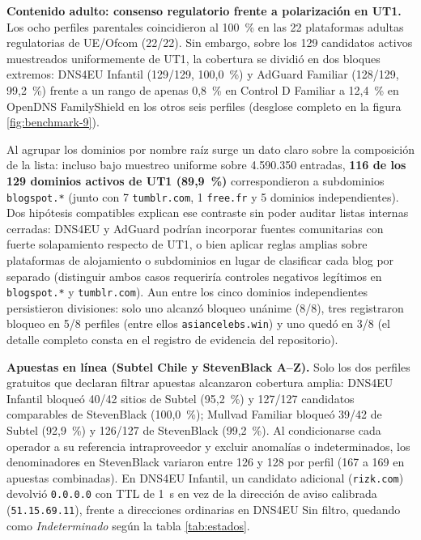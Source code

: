 \documentclass[10pt,a4paper]{article}
\begin{document}
\textbf{Contenido adulto: consenso regulatorio frente a polarización en UT1.} Los ocho perfiles parentales coincidieron al 100~\% en las 22 plataformas adultas regulatorias de UE/Ofcom (22/22). Sin embargo, sobre los 129 candidatos activos muestreados uniformemente de UT1, la cobertura se dividió en dos bloques extremos: DNS4EU Infantil (129/129, 100,0~\%) y AdGuard Familiar (128/129, 99,2~\%) frente a un rango de apenas 0,8~\% en Control D Familiar a 12,4~\% en OpenDNS FamilyShield en los otros seis perfiles (desglose completo en la figura \ref{fig:benchmark-9}).

Al agrupar los dominios por nombre raíz surge un dato claro sobre la composición de la lista: incluso bajo muestreo uniforme sobre 4.590.350 entradas, \textbf{116 de los 129 dominios activos de UT1 (89,9~\%)} correspondieron a subdominios \texttt{blogspot.*} (junto con 7 \texttt{tumblr.com}, 1 \texttt{free.fr} y 5 dominios independientes). Dos hipótesis compatibles explican ese contraste sin poder auditar listas internas cerradas: DNS4EU y AdGuard podrían incorporar fuentes comunitarias con fuerte solapamiento respecto de UT1, o bien aplicar reglas amplias sobre plataformas de alojamiento o subdominios en lugar de clasificar cada blog por separado (distinguir ambos casos requeriría controles negativos legítimos en \texttt{blogspot.*} y \texttt{tumblr.com}). Aun entre los cinco dominios independientes persistieron divisiones: solo uno alcanzó bloqueo unánime (8/8), tres registraron bloqueo en 5/8 perfiles (entre ellos \texttt{asiancelebs.win}) y uno quedó en 3/8 (el detalle completo consta en el registro de evidencia del repositorio).

\textbf{Apuestas en línea (Subtel Chile y StevenBlack A--Z).} Solo los dos perfiles gratuitos que declaran filtrar apuestas alcanzaron cobertura amplia: DNS4EU Infantil bloqueó 40/42 sitios de Subtel (95,2~\%) y 127/127 candidatos comparables de StevenBlack (100,0~\%); Mullvad Familiar bloqueó 39/42 de Subtel (92,9~\%) y 126/127 de StevenBlack (99,2~\%). Al condicionarse cada operador a su referencia intraproveedor y excluir anomalías o indeterminados, los denominadores en StevenBlack variaron entre 126 y 128 por perfil (167 a 169 en apuestas combinadas). En DNS4EU Infantil, un candidato adicional (\texttt{rizk.com}) devolvió \texttt{0.0.0.0} con TTL de 1~s en vez de la dirección de aviso calibrada (\texttt{51.15.69.11}), frente a direcciones ordinarias en DNS4EU Sin filtro, quedando como \emph{Indeterminado} según la tabla \ref{tab:estados}.
\end{document}
